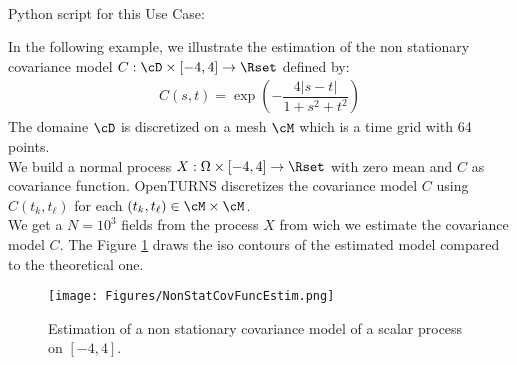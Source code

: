 \textspace\\
Python script for this Use Case:


In the following example, we illustrate the estimation of the non stationary covariance model $C : \cD \times [-4, 4] \rightarrow  \Rset $ defined by:
\begin{align}
  \displaystyle C(s,t) = \exp\left(-\dfrac{4|s-t|}{1+s^2+t^2}\right)
\end{align}
The domaine $\cD$ is  discretized on a mesh $\cM$ which is a time grid with 64 points.\\
We build a normal process $X: \Omega \times [-4, 4]  \rightarrow \Rset$ with zero mean and $C$ as covariance function. OpenTURNS discretizes the covariance model $C$ using $C(t_k, t_\ell)$ for each $(t_k, t_\ell)\in \cM \times \cM$.\\
We get a $N=10^3$ fields from the process $X$ from wich we estimate the covariance model $C$. The Figure \ref{NonStatCovEstim} draws the iso contours of the estimated model compared to the theoretical one.


\begin{figure}[H]
  \begin{center}
    \texttt{[image: Figures/NonStatCovFuncEstim.png]}
    \caption{Estimation of a non stationary covariance model of a scalar process on $[-4, 4]$.}
    \label{NonStatCovEstim}
  \end{center}
\end{figure}
